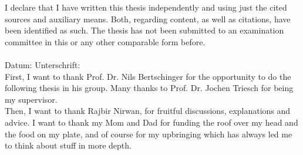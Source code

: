 \label{erklaerung}
I declare that I have written this thesis independently and using just the cited sources and auxiliary means. Both, regarding content, as well as citations, have been identified as such. The thesis has not been submitted to an examination committee in this or any other comparable form before. \\
\\[1.5cm]
Datum:	\hrulefill\enspace Unterschrift: \hrulefill
\\[3.5cm]

\newpage
{}
\label{danksagungen}
First, I want to thank Prof. Dr. Nils Bertschinger for the opportunity to do the following thesis in his group. Many thanks to Prof. Dr. Jochen Triesch for being my supervisor.\\
Then, I want to thank Rajbir Nirwan, for fruitful discussions, explanations and advice.
I want to thank my Mom and Dad for funding the roof over my head and the food on my plate, and of course for my upbringing which has always led me to think about stuff in more depth. \\


